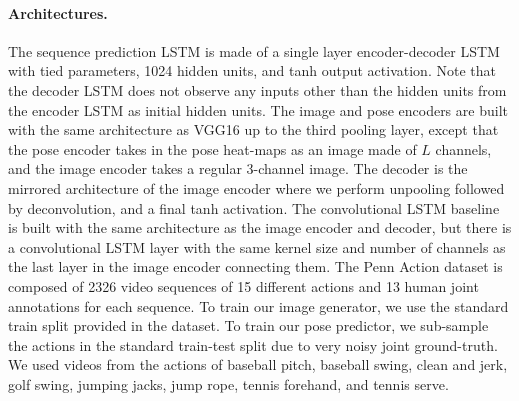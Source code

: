 \documentclass{article}
\newcommand{\cutsubsectionup}{\vspace*{-0.09in}}
\newcommand{\cutsubsectiondown}{\vspace*{-0.04in}}
\newcommand{\cutsubsectionup}{}
\newcommand{\cutsubsectiondown}{}
\begin{document}
\vspace{-8pt}\paragraph{Architectures.}
The sequence prediction LSTM is made of a single layer encoder-decoder LSTM with tied parameters, 1024 hidden units, and tanh output activation.
Note that the decoder LSTM does not observe any inputs other than the hidden units from the encoder LSTM as initial hidden units.
The image and pose encoders are built with the same architecture as VGG16 \cite{Vgg16} up to the third pooling layer, except that the pose encoder takes in the pose heat-maps as an image made of $L$ channels, and the image encoder takes a regular $3$-channel image.
The decoder is the mirrored architecture of the image encoder where we perform unpooling followed by deconvolution, and a final tanh activation.
The convolutional LSTM baseline is built with the same architecture as the image encoder and decoder, but there is a convolutional LSTM layer with the same kernel size and number of channels as the last layer in the image encoder connecting them.
The Penn Action dataset is composed of 2326 video sequences of 15 different actions and 13 human joint annotations for each sequence.
To train our image generator, we use the standard train split provided in the dataset.
To train our pose predictor, we sub-sample the actions in the standard train-test split due to very noisy joint ground-truth.
We used videos from the actions of baseball pitch, baseball swing, clean and jerk, golf swing, jumping jacks, jump rope, tennis forehand, and tennis serve.
\end{document}
